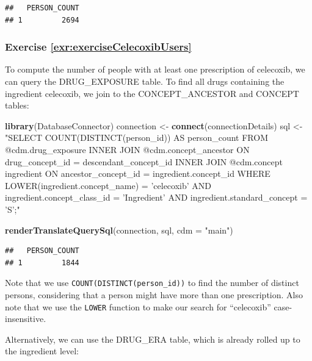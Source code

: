 \documentclass[11pt]{book}
\newenvironment{Shaded}{\begin{snugshade}}{\end{snugshade}}
\newcommand{\KeywordTok}[1]{\textcolor[rgb]{0.13,0.29,0.53}{\textbf{#1}}}
\newcommand{\DataTypeTok}[1]{\textcolor[rgb]{0.13,0.29,0.53}{#1}}
\newcommand{\StringTok}[1]{\textcolor[rgb]{0.31,0.60,0.02}{#1}}
\newcommand{\NormalTok}[1]{#1}
\theoremstyle{definition}
\theoremstyle{definition}
\theoremstyle{definition}
\theoremstyle{remark}
\begin{document}
\begin{verbatim}
##   PERSON_COUNT
## 1         2694
\end{verbatim}

\subsubsection*{Exercise
\ref{exr:exerciseCelecoxibUsers}}\label{exercise-refexrexercisecelecoxibusers}

To compute the number of people with at least one prescription of
celecoxib, we can query the DRUG\_EXPOSURE table. To find all drugs
containing the ingredient celecoxib, we join to the CONCEPT\_ANCESTOR
and CONCEPT tables:

\begin{Shaded}
\begin{Highlighting}[]
\KeywordTok{library}\NormalTok{(DatabaseConnector)}
\NormalTok{connection <-}\StringTok{ }\KeywordTok{connect}\NormalTok{(connectionDetails)}
\NormalTok{sql <-}\StringTok{ "SELECT COUNT(DISTINCT(person_id)) AS person_count}
\StringTok{FROM @cdm.drug_exposure}
\StringTok{INNER JOIN @cdm.concept_ancestor}
\StringTok{  ON drug_concept_id = descendant_concept_id}
\StringTok{INNER JOIN @cdm.concept ingredient}
\StringTok{  ON ancestor_concept_id = ingredient.concept_id}
\StringTok{WHERE LOWER(ingredient.concept_name) = 'celecoxib'}
\StringTok{  AND ingredient.concept_class_id = 'Ingredient'}
\StringTok{  AND ingredient.standard_concept = 'S';"}

\KeywordTok{renderTranslateQuerySql}\NormalTok{(connection, sql, }\DataTypeTok{cdm =} \StringTok{"main"}\NormalTok{)}
\end{Highlighting}
\end{Shaded}

\begin{verbatim}
##   PERSON_COUNT
## 1         1844
\end{verbatim}

Note that we use \texttt{COUNT(DISTINCT(person\_id))} to find the number
of distinct persons, considering that a person might have more than one
prescription. Also note that we use the \texttt{LOWER} function to make
our search for ``celecoxib'' case-insensitive.

Alternatively, we can use the DRUG\_ERA table, which is already rolled
up to the ingredient level:
\end{document}
